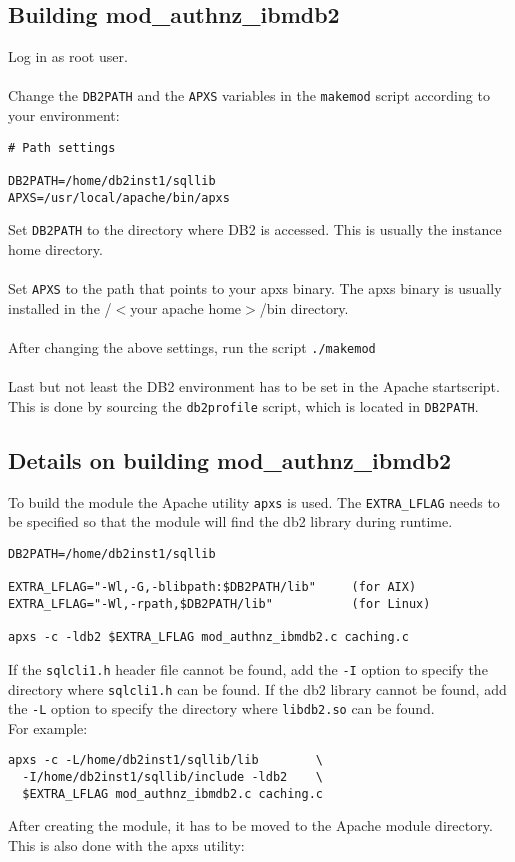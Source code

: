 \documentclass[11pt,letterpaper]{article}
\begin{document}
\subsection{Building mod\_authnz\_ibmdb2}
Log in as root user.\\
\\
Change the {\tt DB2PATH} and the {\tt APXS} variables in the {\tt makemod} script according to your environment:
\begin{verbatim}
# Path settings

DB2PATH=/home/db2inst1/sqllib
APXS=/usr/local/apache/bin/apxs
\end{verbatim}
Set {\tt DB2PATH} to the directory where DB2 is accessed. This is usually the instance home directory.\\
\\
Set {\tt APXS} to the path that points to your apxs binary. The apxs binary is usually installed in the /$<$your apache home$>$/bin directory.\\
\\
After changing the above settings, run the script {\tt ./makemod}\\
\\
Last but not least the DB2 environment has to be set in the Apache startscript. This is done by sourcing the {\tt db2profile} script, which is located in {\tt DB2PATH}.
\subsection{Details on building mod\_authnz\_ibmdb2}
To build the module the Apache utility {\tt apxs} is used. The {\tt EXTRA\_LFLAG} needs to be specified so that the module will find the db2 library during runtime.
\begin{verbatim}
DB2PATH=/home/db2inst1/sqllib

EXTRA_LFLAG="-Wl,-G,-blibpath:$DB2PATH/lib"     (for AIX)
EXTRA_LFLAG="-Wl,-rpath,$DB2PATH/lib"           (for Linux)

apxs -c -ldb2 $EXTRA_LFLAG mod_authnz_ibmdb2.c caching.c
\end{verbatim}
If the {\tt sqlcli1.h} header file cannot be found, add the {\tt -I} option to specify the
directory where {\tt sqlcli1.h} can be found.
If the db2 library cannot be found, add the {\tt -L} option to specify the
directory where {\tt libdb2.so} can be found.\\

For example:
\begin{verbatim}
apxs -c -L/home/db2inst1/sqllib/lib        \
  -I/home/db2inst1/sqllib/include -ldb2    \
  $EXTRA_LFLAG mod_authnz_ibmdb2.c caching.c
\end{verbatim}
After creating the module, it has to be moved to the Apache module directory. This is also done with the apxs utility:
\end{document}
